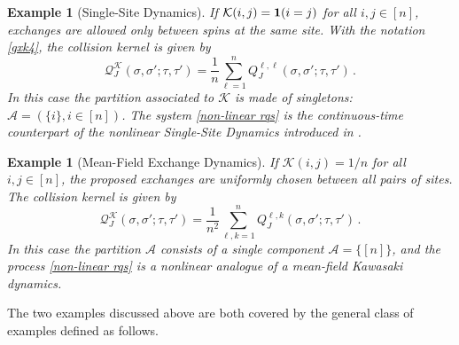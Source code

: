 \documentclass[11pt,reqno]{amsart}
\numberwithin{equation}{section}
\numberwithin{figure}{section}
\newtheorem{example}[theorem]{Example}
\newcommand{\1}{\mathds{1}}
\newcommand{\cA}{\ensuremath{\mathcal A}}
\newcommand{\cK}{\ensuremath{\mathcal K}}
\begin{document}
\begin{example}[Single-Site  Dynamics] \label{ex:ss}  
If \(\cK(i,j)={\bf 1}(i=j)\) for all \(i,j\in [n]\), %
exchanges are allowed only between spins at the same site. With the notation \eqref{gxk4}, the %
collision kernel is given by
\begin{equation}
      \mathcal{Q}_J^\mathcal{K}(\sigma, \sigma'; \tau, \tau') = \frac1n\sum_{\ell=1}^n Q_J^{\ell,\ell}(\sigma, \sigma'; \tau, \tau')\,.
\end{equation}
In this case the partition associated to \(\cK\) is made of singletons: \(\cA=(\{i\}, i\in [n])\). The system \eqref{non-linear rqs} is the continuous-time counterpart of the nonlinear Single-Site Dynamics introduced in \cite{AC2024nonlinear}.
\end{example}

\begin{example}[Mean-Field Exchange Dynamics]   \label{ex:mf}
If \(\cK(i,j)=1/n\) for all \(i,j\in[n]\), the proposed exchanges are uniformly chosen between all pairs of sites. 
The %
collision kernel is given by
\begin{equation}
      \mathcal{Q}_J^\mathcal{K}(\sigma, \sigma'; \tau, \tau') = \frac1{n^2}\sum_{\ell,k=1}^n Q_J^{\ell,k}(\sigma, \sigma'; \tau, \tau')\,.
\end{equation}
In this case the partition $\cA$ %
consists  of a single component \(\cA=\{[n]\}\), and the process \eqref{non-linear rqs} is a nonlinear analogue of a mean-field Kawasaki dynamics. 
\end{example}

The two examples discussed above are both covered by the general class of examples defined as follows. 
\end{document}
